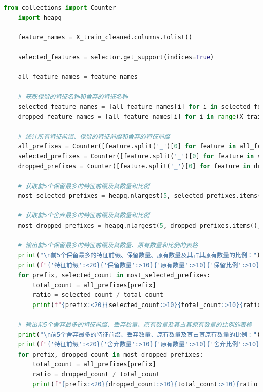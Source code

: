 \documentclass[
    report,     %
    oneside,    %
    UTF8,       %
    zihao=-4    %
]{config} %
\begin{document}
\begin{lstlisting}[label=code:lasso_features_discarding, language=Python, caption=Lasso：查看特征选择过程中保留与舍弃的特征]
    from collections import Counter
    import heapq
    
    feature_names = X_train_cleaned.columns.tolist()
    
    selected_features = selector.get_support(indices=True)
    
    all_feature_names = feature_names
    
    # 获取保留的特征名称和舍弃的特征名称
    selected_feature_names = [all_feature_names[i] for i in selected_features]
    dropped_feature_names = [all_feature_names[i] for i in range(X_train_cleaned.shape[1]) if i not in selected_features]
    
    # 统计所有特征前缀、保留的特征前缀和舍弃的特征前缀
    all_prefixes = Counter([feature.split('_')[0] for feature in all_feature_names])
    selected_prefixes = Counter([feature.split('_')[0] for feature in selected_feature_names])
    dropped_prefixes = Counter([feature.split('_')[0] for feature in dropped_feature_names])
    
    # 获取前5个保留最多的特征前缀及其数量和比例
    most_selected_prefixes = heapq.nlargest(5, selected_prefixes.items(), key=lambda x: x[1])
    
    # 获取前5个舍弃最多的特征前缀及其数量和比例
    most_dropped_prefixes = heapq.nlargest(5, dropped_prefixes.items(), key=lambda x: x[1])
    
    # 输出前5个保留最多的特征前缀及其数量、原有数量和比例的表格
    print("\n前5个保留最多的特征前缀、保留数量、原有数量及其占其原有数量的比例：")
    print(f"{'特征前缀':<20}{'保留数量':>10}{'原有数量':>10}{'保留比例':>10}")
    for prefix, selected_count in most_selected_prefixes:
        total_count = all_prefixes[prefix]
        ratio = selected_count / total_count
        print(f"{prefix:<20}{selected_count:>10}{total_count:>10}{ratio:>10.2%}")
    
    # 输出前5个舍弃最多的特征前缀、丢弃数量、原有数量及其占其原有数量的比例的表格
    print("\n前5个舍弃最多的特征前缀、丢弃数量、原有数量及其占其原有数量的比例：")
    print(f"{'特征前缀':<20}{'舍弃数量':>10}{'原有数量':>10}{'舍弃比例':>10}")
    for prefix, dropped_count in most_dropped_prefixes:
        total_count = all_prefixes[prefix]
        ratio = dropped_count / total_count
        print(f"{prefix:<20}{dropped_count:>10}{total_count:>10}{ratio:>10.2%}")
\end{lstlisting}
\end{document}
